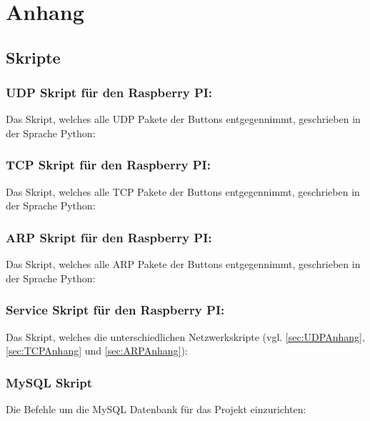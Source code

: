 \section{Anhang}
\subsection{Skripte}
\label{sec:Skripte-1} 

\subsubsection{UDP Skript für den Raspberry PI:}$\;$ \\  
\label{sec:UDPAnhang}
Das Skript, welches alle \ac{UDP} Pakete der Buttons entgegennimmt, geschrieben in der Sprache Python:

\newpage

\subsubsection{TCP Skript für den Raspberry PI:}$\;$ \\  
\label{sec:TCPAnhang}
Das Skript, welches alle \ac{TCP} Pakete der Buttons entgegennimmt, geschrieben in der Sprache Python:

\newpage

\subsubsection{ARP Skript für den Raspberry PI:}$\;$ \\  
\label{sec:ARPAnhang}
Das Skript, welches alle \ac{ARP} Pakete der Buttons entgegennimmt, geschrieben in der Sprache Python:

\newpage

\subsubsection{Service Skript für den Raspberry PI:}$\;$ \\
\label{sec:ServiceAnhang}
Das Skript, welches die unterschiedlichen Netzwerkskripte (vgl. \ref{sec:UDPAnhang}, \ref{sec:TCPAnhang} und \ref{sec:ARPAnhang}):

\newpage

\subsubsection{MySQL Skript}
\label{sec:MySQLSkript}
Die Befehle um die MySQL Datenbank für das Projekt einzurichten: 

\newpage 

